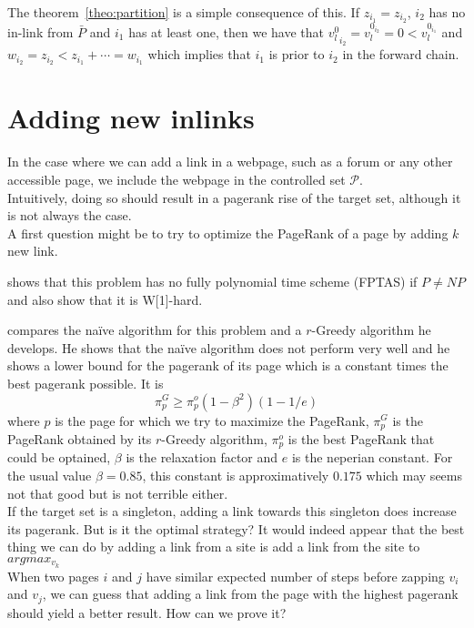 \documentclass{article}
\newcommand{\1}{\mathbf{1}}
\theoremstyle{definition}
\begin{document}
The theorem~\ref{theo:partition} is a simple consequence of this.
If $z_{i_1} = z_{i_2}$, $i_2$ has no in-link from $\bar{P}$ and $i_1$ has at least one,
then we have that
${v_l^0}_{i_2} = v_l^{0_{i_2}} = 0 < v_l^{0_{i_1}}$ and $w_{i_2} = z_{i_2} < z_{i_1} + \cdots = w_{i_1}$
which implies that $i_1$ is prior to $i_2$ in the forward chain.

\section{Adding new inlinks}
In the case where we can add a link in a webpage, such as a forum or any other accessible page, we include the webpage in the controlled set $\mathcal{P}$.\\
Intuitively, doing so should result in a pagerank rise of the target set, although it is not always the case.\\
A first question might be to try to optimize the PageRank of a page
by adding $k$ new link.

\cite{olsen2010maximizing} shows that this problem has no fully polynomial time scheme (FPTAS) if $P \neq NP$ and also show that it is W[1]-hard.

\cite{olsen2010constant} compares the naïve algorithm for this problem and a $r$-Greedy algorithm he develops.
He shows that the naïve algorithm does not perform very well and he shows a lower bound for the pagerank of its page which is a constant times the best pagerank possible. It is
\[ \pi_p^G \geq \pi_p^o(1 - \beta^2)(1 - 1/e) \]
where $p$ is the page for which we try to maximize the PageRank,
$\pi_p^G$ is the PageRank obtained by its $r$-Greedy algorithm, $\pi_p^o$ is the best PageRank that could be optained, $\beta$ is the relaxation factor and $e$ is the neperian constant.
For the usual value $\beta = 0.85$, this constant is approximatively $0.175$ which may seems not that good but is not terrible either.\\
If the target set is a singleton, adding a link towards this singleton does increase its pagerank. But is it the optimal strategy? It would indeed appear that the best thing we can do by adding a link from a site is add a link from the site to $argmax_{v_k}$\\ 
When two pages $i$ and $j$ have similar expected number of steps before zapping $v_i$ and $v_j$, we can guess that adding a link from the page with the highest pagerank should yield a better result. How can we prove it? 
\end{document}
